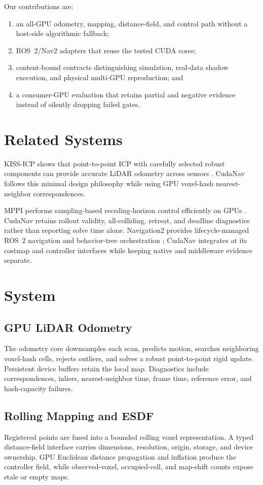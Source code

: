 \documentclass[conference]{IEEEtran}
\begin{document}
Our contributions are:
\begin{enumerate}
  \item an all-GPU odometry, mapping, distance-field, and control path without
        a host-side algorithmic fallback;
  \item ROS~2/Nav2 adapters that reuse the tested CUDA cores;
  \item content-bound contracts distinguishing simulation, real-data shadow
        execution, and physical multi-GPU reproduction; and
  \item a consumer-GPU evaluation that retains partial and negative evidence
        instead of silently dropping failed gates.
\end{enumerate}

\section{Related Systems}
KISS-ICP shows that point-to-point ICP with carefully selected robust
components can provide accurate LiDAR odometry across sensors
\cite{vizzo2023kissicp}. CudaNav follows this minimal design philosophy while
using GPU voxel-hash nearest-neighbor correspondences.

MPPI performs sampling-based receding-horizon control efficiently on GPUs
\cite{williams2017mppi}. CudaNav retains rollout validity, all-colliding,
retreat, and deadline diagnostics rather than reporting solve time alone.
Navigation2 provides lifecycle-managed ROS~2 navigation and behavior-tree
orchestration \cite{macenski2020marathon2}; CudaNav integrates at its costmap
and controller interfaces while keeping native and middleware evidence
separate.

\section{System}
\subsection{GPU LiDAR Odometry}
The odometry core downsamples each scan, predicts motion, searches neighboring
voxel-hash cells, rejects outliers, and solves a robust point-to-point rigid
update. Persistent device buffers retain the local map. Diagnostics include
correspondences, inliers, nearest-neighbor time, frame time, reference error,
and hash-capacity failures.

\subsection{Rolling Mapping and ESDF}
Registered points are fused into a bounded rolling voxel representation. A
typed distance-field interface carries dimensions, resolution, origin,
storage, and device ownership. GPU Euclidean distance propagation and
inflation produce the controller field, while observed-voxel, occupied-cell,
and map-shift counts expose stale or empty maps.
\end{document}
